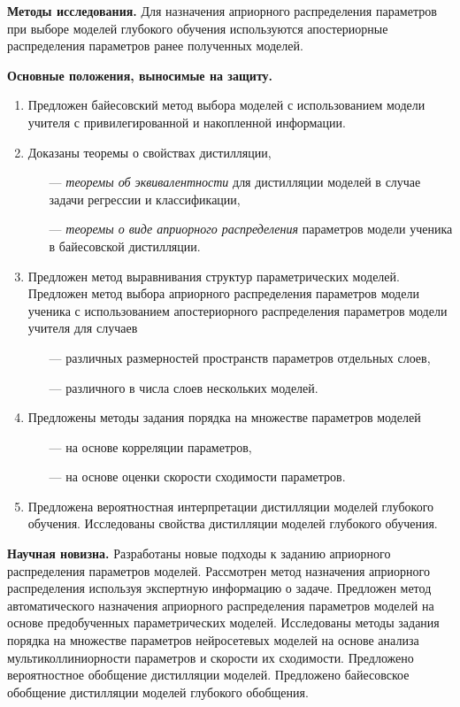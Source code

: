 \vspace{0.5cm}
\textbf{Методы исследования.} Для назначения априорного распределения параметров при выборе моделей глубокого обучения используются апостериорные распределения параметров ранее полученных моделей.

\vspace{0.5cm}
\textbf{Основные положения, выносимые на защиту.}
\vspace{0.3cm}
\begin{enumerate}
    \item Предложен байесовский метод выбора моделей с использованием модели учителя с привилегированной и накопленной информации.
    \item Доказаны теоремы о свойствах дистилляции, 
    \begin{itemize}
        \item[---] \emph{теоремы об эквивалентности} для дистилляции моделей в случае задачи регрессии и классификации,
        \item[---] \emph{теоремы о виде априорного распределения} параметров модели ученика в байесовской дистилляции.
    \end{itemize}
    \item Предложен метод выравнивания структур параметрических моделей. Предложен метод выбора априорного распределения параметров модели ученика с использованием апостериорного распределения параметров модели учителя для случаев
    \begin{itemize}
        \item[---] различных размерностей пространств параметров отдельных слоев,
        \item[---] различного в числа слоев нескольких моделей.
    \end{itemize}
    \item Предложены методы задания порядка на множестве параметров моделей
    \begin{itemize}
        \item[---] на основе корреляции параметров,
        \item[---] на основе оценки скорости сходимости параметров.
    \end{itemize}
    \item Предложена вероятностная интерпретации дистилляции моделей глубокого обучения. Исследованы свойства дистилляции моделей глубокого обучения.
\end{enumerate}

\vspace{0.5cm}
\textbf{Научная новизна.} Разработаны новые подходы к заданию априорного распределения параметров моделей. Рассмотрен метод назначения априорного распределения используя экспертную информацию о задаче. Предложен метод автоматического назначения априорного распределения параметров моделей на основе предобученных параметрических моделей. Исследованы методы задания порядка на множестве параметров нейросетевых моделей на основе анализа мультиколлиниорности параметров и скорости их сходимости. Предложено вероятностное обобщение дистилляции моделей. Предложено байесовское обобщение дистилляции моделей глубокого обобщения.

